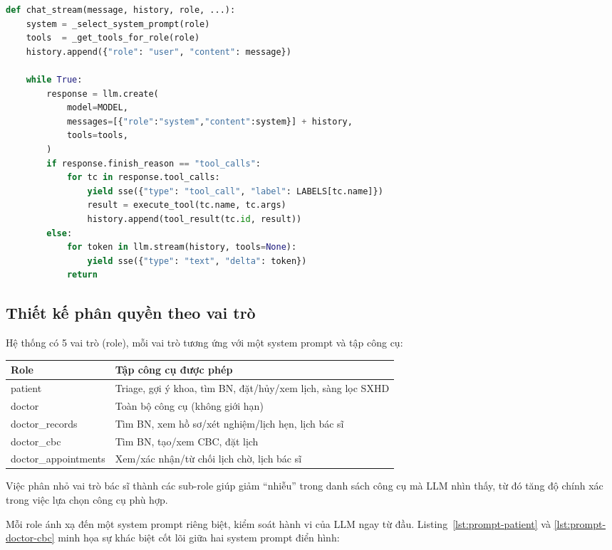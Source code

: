 \documentclass[oneside, a4paper]{book}
\theoremstyle{plain}
\theoremstyle{plain}
\theoremstyle{definition}
\theoremstyle{remark}
\begin{document}
\begin{lstlisting}[language=Python, caption={Thuật toán tool-calling loop rút gọn}]
def chat_stream(message, history, role, ...):
    system = _select_system_prompt(role)
    tools  = _get_tools_for_role(role)
    history.append({"role": "user", "content": message})

    while True:
        response = llm.create(
            model=MODEL,
            messages=[{"role":"system","content":system}] + history,
            tools=tools,
        )
        if response.finish_reason == "tool_calls":
            for tc in response.tool_calls:
                yield sse({"type": "tool_call", "label": LABELS[tc.name]})
                result = execute_tool(tc.name, tc.args)
                history.append(tool_result(tc.id, result))
        else:
            for token in llm.stream(history, tools=None):
                yield sse({"type": "text", "delta": token})
            return
\end{lstlisting}

\subsection{Thiết kế phân quyền theo vai trò}

Hệ thống có 5 vai trò (role), mỗi vai trò tương ứng với một system prompt và tập công cụ:

\begin{table}[H]
\centering
\begin{tabular}{|>{\footnotesize\ttfamily}p{3.8cm}|p{9cm}|}
\hline
\normalfont\textbf{Role} & \textbf{Tập công cụ được phép} \\
\hline
patient & Triage, gợi ý khoa, tìm BN, đặt/hủy/xem lịch, sàng lọc SXHD \\
doctor & Toàn bộ công cụ (không giới hạn) \\
doctor\_records & Tìm BN, xem hồ sơ/xét nghiệm/lịch hẹn, lịch bác sĩ \\
doctor\_cbc & Tìm BN, tạo/xem CBC, đặt lịch \\
doctor\_appointments & Xem/xác nhận/từ chối lịch chờ, lịch bác sĩ \\
\hline
\end{tabular}
\end{table}

Việc phân nhỏ vai trò bác sĩ thành các sub-role giúp giảm ``nhiễu'' trong danh sách công cụ mà LLM nhìn thấy, từ đó tăng độ chính xác trong việc lựa chọn công cụ phù hợp.

Mỗi role ánh xạ đến một system prompt riêng biệt, kiểm soát hành vi của LLM ngay từ đầu. Listing~\ref{lst:prompt-patient} và \ref{lst:prompt-doctor-cbc} minh họa sự khác biệt cốt lõi giữa hai system prompt điển hình:
\end{document}

